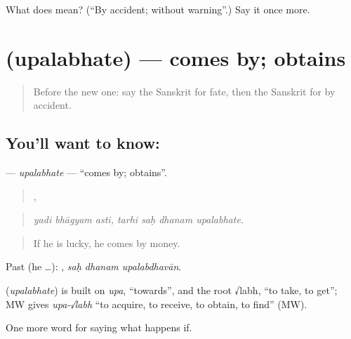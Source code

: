 \begin{tcolorbox}[breakable,colback=teal!4,colframe=teal!35!black,title={Before you move on}]
What does  mean? (\textquotedblleft{}By accident; without warning\textquotedblright{}.) Say it once more.
\end{tcolorbox}
\section[\texorpdfstring{\sk{उपलभते} (upalabhate)}{उपलभते (upalabhate)}]{ (upalabhate) — comes by; obtains}

\label{lesson:SA-C369-upalabhate}



\begin{quote}
Before the new one: say the Sanskrit for fate, then the Sanskrit for by accident.
\end{quote}

\subsection*{You'll want to know: }
\textbf{} — \emph{upalabhate} — \textquotedblleft{}comes by; obtains\textquotedblright{}.

\begin{quote}
  ,    
\end{quote}

\begin{quote}
\emph{yadi bhāgyam asti, tarhi saḥ dhanam upalabhate.}
\end{quote}

\begin{quote}
If he is lucky, he comes by money.
\end{quote}

Past (he …):   , \emph{saḥ dhanam upalabdhavān}.

\begin{cousinweb}
\textbf{} (\emph{upalabhate}) is built on \emph{upa}, \textquotedblleft{}towards\textquotedblright{}, and the root √labh, \textquotedblleft{}to take, to get\textquotedblright{}; MW gives \emph{upa-√labh} \textquotedblleft{}to acquire, to receive, to obtain, to find\textquotedblright{} (MW).
\end{cousinweb}

\begin{grammarlens}[title={What you've built}]
One more word for saying what happens if.
\end{grammarlens}

